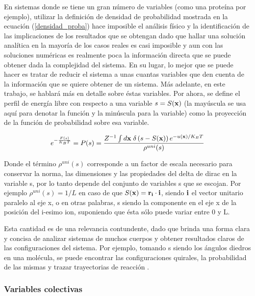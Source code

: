 \documentclass [11pt]{article}
\begin{document}
En sistemas donde se tiene un gran número de variables (como una proteína por ejemplo), utilizar la definición de densidad de probabilidad mostrada en la ecuación (\ref{densidad_proba}) hace imposible el análisis físico y la identificación de las implicaciones de los resultados que se obtengan dado que hallar una solución analítica en la mayoría de los casos reales es casi imposible y aun con las soluciones numéricas es realmente poca la información directa que se puede obtener dada la complejidad del sistema. En su lugar, lo mejor que se puede hacer es tratar de reducir el sistema a unas cuantas variables que den cuenta de la información que se quiere obtener de un sistema. Más adelante, en este trabajo, se hablará más en detalle sobre éstas variables. Por ahora, se define el perfil de energía libre con respecto a una variable $s= S({\bf x})$ (la mayúscula se usa aquí para denotar la función y la minúscula para la variable) como la proyección de la función de probabilidad sobre esa variable.

\begin{equation}\label{FES}
    e^{-\frac{F(s)}{K_BT}}=P(s)= \frac{Z^{-1}\int d{\bf x}\hspace{0.1 cm}\delta \left(s-S({\bf x})\right)e^{-u({\bf x})/K_BT}}{\rho^{uni}(s)}
\end{equation}

Donde el término $\rho^{uni}(s)$ corresponde a un factor de escala necesario para conservar la norma, las dimensiones y las propiedades del delta de dirac en la variable s, por lo tanto depende del conjunto de variables s que se escojan. Por ejemplo $\rho^{uni}(s)=1/L$ en caso de que $S({\bf x})={\bf r_i}\cdot{\bf i}$, siendo ${\bf i}$ el vector unitario paralelo al eje x, o en otras palabras, s siendo la componente en el eje x de la posición del i-esimo ion, suponiendo que ésta sólo puede variar entre 0 y L.

Esta cantidad es de una relevancia contundente, dado que brinda una forma clara y concisa de analizar sistemas de muchos cuerpos y obtener resultados claros de las configuraciones del sistema. Por ejemplo, tomando s siendo los ángulos diedros en una molécula, se puede encontrar las configuraciones quirales, la probabilidad de las mismas y trazar trayectorias de reacción \cite{laio-gervasio}.

\subsubsection{Variables colectivas}
\end{document}
